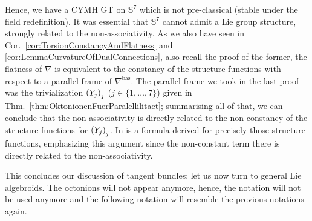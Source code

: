 Hence, we have a CYMH GT on $\mathds{S}^7$ which is not pre-classical (stable under the field redefinition). It was essential that $\mathds{S}^7$ cannot admit a Lie group structure, strongly related to the non-associativity. As we also have seen in Cor.~\ref{cor:TorsionConstancyAndFlatness} and \ref{cor:LemmaCurvatureOfDualConnections}, also recall the proof of the former, the flatness of $\nabla$ is equivalent to the constancy of the structure functions with respect to a parallel frame of $\nabla^{\mathrm{bas}}$. The parallel frame we took in the last proof was the trivialization $\mleft( Y_j \mright)_j$ ($j \in \{1, \dotsc, 7\}$) given in Thm.~\ref{thm:OktonionenFuerParalellilitaet}; summarising all of that, we can conclude that the non-associativity is directly related to the non-constancy of the structure functions for $\mleft( Y_j \mright)_j$. In \cite[Equation (4); an ArXiv preprint]{octonions} is a formula derived for precisely those structure functions, emphasizing this argument since the non-constant term there is directly related to the non-associativity.

This concludes our discussion of tangent bundles; let us now turn to general Lie algebroids. The octonions will not appear anymore, hence, the notation will not be used anymore and the following notation will resemble the previous notations again.